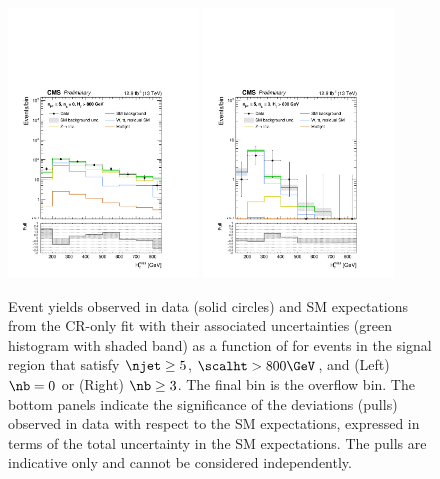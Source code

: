 \begin{figure}[!tbhp]
  \begin{center}
    \includegraphics[width=0.45\textwidth]{Figures/statisticalResults/mhtShape_eq0b_ge5j_800_Inf_fit_b.pdf} 
    \includegraphics[width=0.45\textwidth]{Figures/statisticalResults/mhtShape_ge3b_ge5j_800_Inf_fit_b.pdf} 
  \end{center}
  \caption{Event yields observed in data (solid circles) and SM
    expectations from the CR-only fit with their associated
    uncertainties (green histogram with shaded band) as a function of
    \mht for events in the signal region that satisfy $\njet \geq
    5$, $\scalht > 800\GeV$, and (Left) $\nb = 0$ or (Right) $\nb \geq
    3$. The final bin is the overflow bin. The bottom panels indicate
    the significance of the deviations (pulls) observed in data with respect
    to the SM expectations, expressed in terms of the total
    uncertainty in the SM expectations. The pulls are indicative only
    and cannot be considered independently.  
    \label{fig:mht-templates} 
  }
\end{figure}

